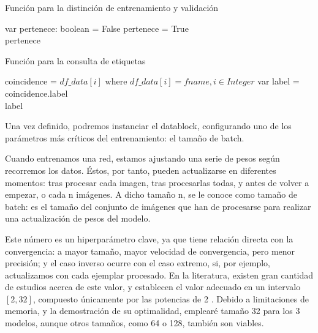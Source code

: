 \begin{algorithm}[H]
	\caption{Función para la distinción de entrenamiento y validación}
	\label{fig:particiones}
	\begin{algorithmic}[1]
		
		\State var pertenece: boolean = False
			\State pertenece = True
		\EndIf \\
		\Return pertenece
		\EndProcedure
		
	\end{algorithmic}
\end{algorithm}

\begin{algorithm}[H]
	\caption{Función para la consulta de etiquetas}
	\label{fig:etiquetadobinario}
	\begin{algorithmic}[1]
		
		\Procedure{ binary\_label}{fname, df\_data: Dataframe}
		\State coincidence = $df\_data[i]$ where $df\_data[i] = fname, i \in Integer$
		\State var label = coincidence.label\\
		\Return label
		\EndProcedure
		
	\end{algorithmic}
\end{algorithm}

Una vez definido, podremos instanciar el datablock, configurando uno de los parámetros más críticos del entrenamiento: el tamaño de batch.

Cuando entrenamos una red, estamos ajustando una serie de pesos según recorremos los datos. Éstos, por tanto, pueden actualizarse en diferentes momentos: tras procesar cada imagen, tras procesarlas todas, y antes de volver a empezar, o cada n imágenes. A dicho tamaño n, se le conoce como tamaño de batch: es el tamaño del conjunto de imágenes que han de procesarse para realizar una actualización de pesos del modelo. 

Este número es un hiperparámetro clave, ya que tiene relación directa con la convergencia: a mayor tamaño, mayor velocidad de convergencia, pero menor precisión; y el caso inverso ocurre con el caso extremo, si, por ejemplo, actualizamos con cada ejemplar procesado. En la literatura, existen gran cantidad de estudios acerca de este valor, y establecen el valor adecuado en un intervalo $[2, 32]$,  compuesto únicamente por las potencias de 2   \cite{masters2018revisiting}. Debido a limitaciones de memoria, y la demostración de su optimalidad, emplearé tamaño 32 para los 3 modelos, aunque otros tamaños, como 64 o 128, también son viables.

